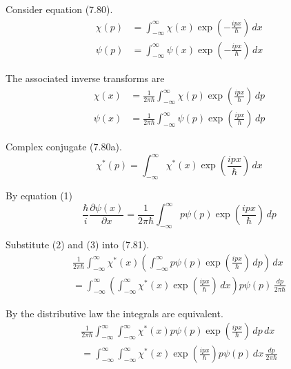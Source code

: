 


\bigskip
Consider equation (7.80).
\begin{align*}
\chi(p)&=\int_{-\infty}^\infty\chi(x)\exp\left(-\frac{ipx}{\hbar}\right)\,dx
\tag{7.80a}
\\
\psi(p)&=\int_{-\infty}^\infty\psi(x)\exp\left(-\frac{ipx}{\hbar}\right)\,dx
\tag{7.80b}
\end{align*}

The associated inverse transforms are
\begin{align*}
\chi(x)&=\frac{1}{2\pi\hbar}\int_{-\infty}^\infty\chi(p)\exp\left(\frac{ipx}{\hbar}\right)\,dp
\\
\psi(x)&=\frac{1}{2\pi\hbar}\int_{-\infty}^\infty\psi(p)\exp\left(\frac{ipx}{\hbar}\right)\,dp
\tag{1}
\end{align*}

Complex conjugate (7.80a).
\begin{equation*}
\chi^*(p)=\int_{-\infty}^\infty\chi^*(x)\exp\left(\frac{ipx}{\hbar}\right)\,dx
\tag{2}
\end{equation*}

By equation (1)
\begin{equation*}
\frac{\hbar}{i}\frac{\partial\psi(x)}{\partial x}=
\frac{1}{2\pi\hbar}\int_{-\infty}^\infty p\psi(p)\exp\left(\frac{ipx}{\hbar}\right)\,dp
\tag{3}
\end{equation*}

Substitute (2) and (3) into (7.81).
\begin{multline*}
\frac{1}{2\pi\hbar}\int_{-\infty}^\infty
\chi^*(x)
\left(\int_{-\infty}^\infty p\psi(p)\exp\left(\frac{ipx}{\hbar}\right)\,dp\right)
\,dx
\\
=\int_{-\infty}^\infty
\left(\int_{-\infty}^\infty\chi^*(x)\exp\left(\frac{ipx}{\hbar}\right)\,dx\right)
p\psi(p)\,\frac{dp}{2\pi\hbar}
\end{multline*}

By the distributive law the integrals are equivalent.
\begin{multline*}
\frac{1}{2\pi\hbar}\int_{-\infty}^\infty\int_{-\infty}^\infty
\chi^*(x)
p\psi(p)\exp\left(\frac{ipx}{\hbar}\right)
\,dp\,dx
\\
{}=\int_{-\infty}^\infty\int_{-\infty}^\infty
\chi^*(x)\exp\left(\frac{ipx}{\hbar}\right)
p\psi(p)
\,dx\,\frac{dp}{2\pi\hbar}
\end{multline*}


